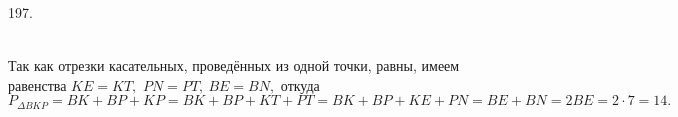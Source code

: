 197. \begin{figure}[ht!]
\end{figure}\\
Так как отрезки касательных, проведённых из одной точки, равны, имеем равенства $KE=KT,$ $PN=PT,\ BE=BN,$ откуда $P_{\Delta BKP}=BK+BP+KP=BK+BP+KT+PT=
BK+BP+KE+PN=BE+BN=2BE=2\cdot7=14.$\newpage\noindent
